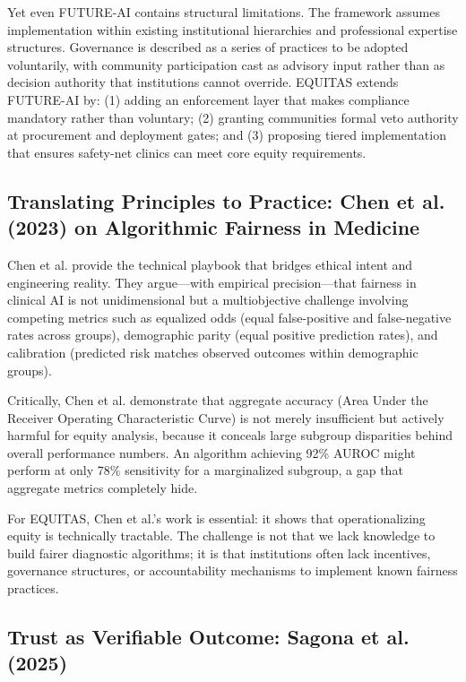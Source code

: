 \documentclass[12pt,a4paper]{article}
\begin{document}
Yet even FUTURE-AI contains structural limitations. The framework assumes implementation within existing institutional hierarchies and professional expertise structures. Governance is described as a series of practices to be adopted voluntarily, with community participation cast as advisory input rather than as decision authority that institutions cannot override.\cite{lekadir2025} EQUITAS extends FUTURE-AI by: (1) adding an enforcement layer that makes compliance mandatory rather than voluntary; (2) granting communities formal veto authority at procurement and deployment gates; and (3) proposing tiered implementation that ensures safety-net clinics can meet core equity requirements.

\subsection{Translating Principles to Practice: Chen et al. (2023) on Algorithmic Fairness in Medicine}

Chen et al. provide the technical playbook that bridges ethical intent and engineering reality. They argue—with empirical precision—that fairness in clinical AI is not unidimensional but a multiobjective challenge involving competing metrics such as equalized odds (equal false-positive and false-negative rates across groups), demographic parity (equal positive prediction rates), and calibration (predicted risk matches observed outcomes within demographic groups).\cite{chen2023}

Critically, Chen et al. demonstrate that aggregate accuracy (Area Under the Receiver Operating Characteristic Curve) is not merely insufficient but actively harmful for equity analysis, because it conceals large subgroup disparities behind overall performance numbers.\cite{chen2023} An algorithm achieving 92\% AUROC might perform at only 78\% sensitivity for a marginalized subgroup, a gap that aggregate metrics completely hide.

For EQUITAS, Chen et al.'s work is essential: it shows that operationalizing equity is technically tractable. The challenge is not that we lack knowledge to build fairer diagnostic algorithms; it is that institutions often lack incentives, governance structures, or accountability mechanisms to implement known fairness practices.\cite{chen2023}

\subsection{Trust as Verifiable Outcome: Sagona et al. (2025)}
\end{document}
